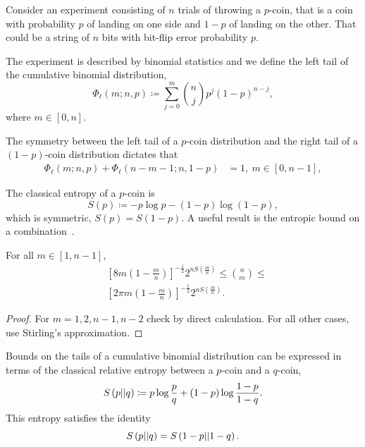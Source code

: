 \documentclass[pra,
aps,
twocolumn,
superscriptaddress,
groupedaddress,
nofootinbib,
reprint
]{revtex4-1}
\begin{document}
Consider an experiment consisting of $n$ trials of throwing a $p$-coin, that is a coin with probability $p$ of landing on one side and $1-p$ of landing on the other.
That could be a string of $n$ bits with bit-flip error probability $p$.

The experiment is described by binomial statistics and we define the left tail of the cumulative binomial distribution,
\begin{equation}\label{eq:phil}
	\Phi_\ell(m; n, p) \coloneqq \sum\limits_{j=0}^m \binom{n}{j} p^j (1-p)^{n-j},
\end{equation}
where $m\in [0,n]$. 

The symmetry between the left tail of a $p$-coin distribution and the right tail of a $(1-p)$-coin distribution dictates that
\begin{align}\label{eq:phi_reverse}
	\Phi_\ell(m; n, p) + \Phi_\ell(n-m-1; n, 1-p) &= 1,\ m\in [0,n-1],
\end{align}

The classical entropy of a $p$-coin is
\begin{equation}\label{eq:ent}
	S(p) \coloneqq -p\log{p} -(1-p)\log{(1-p)},
\end{equation}
which is symmetric, $S(p) = S(1-p)$.
A useful result is the entropic bound on a combination~\cite{cit:ash}.
\begin{lemma}\label{lem:comb_bounds}
	For all $m\in [1,n-1]$,
	\begin{align}
		&\left[ 8m\left(1-\frac{m}{n}\right) \right]^{-\frac{1}{2}} 2^{nS\left(\frac{m}{n}\right)} \leq \binom{n}{m} \leq \\
		&\left[ 2\pi m\left(1-\frac{m}{n}\right) \right]^{-\frac{1}{2}} 2^{nS\left(\frac{m}{n}\right)}.
	\end{align}
\end{lemma}
\begin{proof}
	For $m = 1,2, n-1, n-2$ check by direct calculation.	
	For all other cases, use Stirling's approximation.
\end{proof}

Bounds on the tails of a cumulative binomial distribution can be expressed in terms of the classical relative entropy between a $p$-coin and a $q$-coin,
\begin{equation}\label{eq:ent_rel}
	S\left( p \middle\vert\middle\vert q \right) \coloneqq p \log{\frac{p}{q}} + (1-p) \log{\frac{1-p}{1-q}}.
\end{equation}
This entropy satisfies the identity
\begin{equation}
	S\left( p \middle\vert\middle\vert q \right) = S\left( 1-p \middle\vert\middle\vert 1-q \right).
\end{equation}
\end{document}
